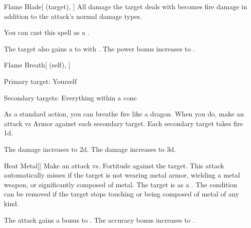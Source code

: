 \lowercase{\hypertarget{spell:Flame Blade}{}}\label{spell:Flame Blade}
\begin{attuneability}[Rank 4]{\hypertarget{spell:Flame Blade}{Flame Blade}}[ (target), ]
All damage the target deals with  becomes fire damage in addition to the attack's normal damage types.

You can cast this spell as a .

\rankline
{} The target also gains a   to  with .
 The power bonus increases to .
\end{attuneability}
\vspace{0.25em}



\lowercase{\hypertarget{spell:Flame Breath}{}}\label{spell:Flame Breath}
\begin{attuneability}[Rank 4]{\hypertarget{spell:Flame Breath}{Flame Breath}}[ (self), ]

Primary target: Yourself
\par\noindent
Secondary targets: Everything within a \arealarge cone

As a standard action, you can breathe fire like a dragon.
When you do, make an attack vs Armor against each secondary target.
\hit Each secondary target takes fire  \plus1d.

\rankline
{} The damage increases to  \plus2d.
 The damage increases to  \plus3d.
\end{attuneability}
\vspace{0.25em}



\lowercase{\hypertarget{spell:Heat Metal}{}}\label{spell:Heat Metal}
\begin{freeability}[Rank 4]{\hypertarget{spell:Heat Metal}{Heat Metal}}[]
Make an attack vs. Fortitude against the target.
This attack automatically misses if the target is not wearing metal armor, wielding a metal weapon, or significantly composed of metal.
\hit The target is  as a .
The condition can be removed if the target stops touching or being composed of metal of any kind.

\rankline
{} The attack gains a  bonus to .
 The accuracy bonus increases to .
\end{freeability}
\vspace{0.25em}




